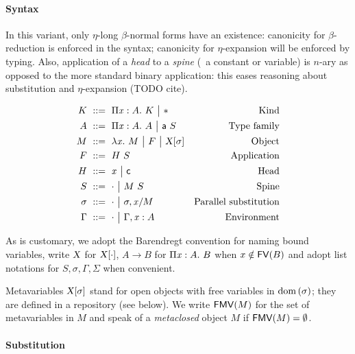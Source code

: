 \documentclass[9pt]{sigplanconf}
\begin{document}
\paragraph{Syntax}

In this variant, only $\eta$-long $\beta$-normal forms have an
existence: canonicity for $\beta$-reduction is enforced in the syntax;
canonicity for $\eta$-expansion will be enforced by typing. Also,
application of a \emph{head} to a \emph{spine} (\ie\ a constant or
variable) is $n$-ary as opposed to the more standard binary
application: this eases reasoning about substitution and
$\eta$-expansion (TODO cite).

\begin{align*}
  K &\ ::=\ 
  \Pi{\ensuremath{\text{\textit{x}}}}:{A}.\  K \ {\big|}\ 
  \mathsf{*} &
  \text{Kind}\\
  A &\ ::=\ 
  \Pi{\ensuremath{\text{\textit{x}}}}:{A}.\  A \ {\big|}\ 
  {\text{\textsf{a}}}\  S &
  \text{Type family} \\
  M &\ ::=\ 
  \lambda{\ensuremath{\text{\textit{x}}}}.\  M \ {\big|}\ 
  F \ {\big|}\ 
  {\text{\textsl{X}}}[{\sigma}] &
  \text{Object} \\
  F &\ ::=\  {H}\  S &
  \text{Application} \\
  H &\ ::=\ 
  \text{\textit{x}} \ {\big|}\ 
  \text{\textsf{c}} &
  \text{Head}\\
  S &\ ::=\ 
  \cdot \ {\big|}\ 
  {M}\ {S} &
  \text{Spine}\\
  \sigma &\ ::=\ 
  \cdot \ {\big|}\ 
  {\sigma},{{\text{\textit{x}}}/{M}} &
  \text{Parallel substitution} \\
  \Gamma &\ ::=\ 
  \cdot \ {\big|}\ 
  {\Gamma},{{\text{\textit{x}}}:{A}} &
  \text{Environment}
\end{align*}

As is customary, we adopt the Barendregt convention for naming bound
variables, write $\text{\textsl{X}}$ for ${\text{\textsl{X}}}[{\cdot}]$, $A\to B$ for
$\Pi{\ensuremath{\text{\textit{x}}}}:{A}.\  B$ when $x\notin {\text{\textsf{FV}}}({B})$ and adopt list notations for $S,
\sigma, \Gamma, \Sigma$ when convenient.

Metavariables ${\text{\textsl{X}}}[{\sigma}]$ stand for open objects with free
variables in $\operatorname{dom}{(\sigma)}$; they are defined in a repository (see
below). We write ${\text{\textsf{FMV}}}({M})$ for the set of metavariables in $M$ and
speak of a \emph{metaclosed} object $M$ if ${\text{\textsf{FMV}}}({M}) = \emptyset$.

\paragraph{Substitution}
\end{document}
